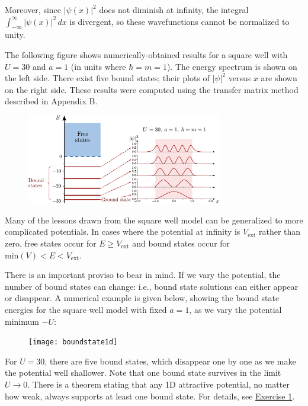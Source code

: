 \documentclass[pra,12pt]{revtex4}
\begin{document}
Moreover, since $|\psi(x)|^2$ does not diminish at infinity, the
integral $\int_{-\infty}^\infty |\psi(x)|^2\, dx$ is divergent, so
these wavefunctions cannot be normalized to unity.

The following figure shows numerically-obtained results for a square
well with $U = 30$ and $a=1$ (in units where $\hbar = m =1$).  The
energy spectrum is shown on the left side.  There exist five bound
states; their plots of $|\psi|^2$ versus $x$ are shown on the right
side.  These results were computed using the transfer matrix method
described in Appendix B.

\begin{figure}[h]
  \centering\includegraphics[width=0.76\textwidth]{boundvsextended}
\end{figure}

Many of the lessons drawn from the square well model can be
generalized to more complicated potentials.  In cases where the
potential at infinity is $V_{\textrm{ext}}$ rather than zero, free
states occur for $E \ge V_{\textrm{ext}}$ and bound states occur for
$\textrm{min}(V) < E < V_{\textrm{ext}}$.

There is an important proviso to bear in mind.  If we vary the
potential, the number of bound states can change: i.e., bound state
solutions can either appear or disappear.  A numerical example is
given below, showing the bound state energies for the square well
model with fixed $a = 1$, as we vary the potential minimum $-U$:

\vskip 0.15in
\begin{figure}[h]
  \centering\texttt{[image: boundstate1d]}
\end{figure}

\noindent
For $U = 30$, there are five bound states, which disappear one by one
as we make the potential well shallower.  Note that one bound state
survives in the limit $U \rightarrow 0$.  There is a theorem stating
that any 1D attractive potential, no matter how weak, always supports
at least one bound state.  For details, see
\hyperref[ex:boundstate]{Exercise 1}.
\end{document}
